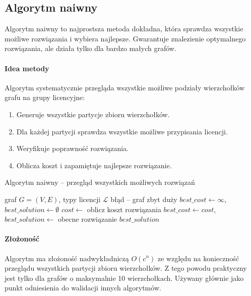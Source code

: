 \subsection{Algorytm naiwny}

Algorytm naiwny to najprostsza metoda dokładna, która sprawdza wszystkie możliwe rozwiązania i wybiera najlepsze. Gwarantuje znalezienie optymalnego rozwiązania, ale działa tylko dla bardzo małych grafów.

\paragraph{Idea metody}
Algorytm systematycznie przegląda wszystkie możliwe podziały wierzchołków grafu na grupy licencyjne:
\begin{enumerate}
  \item Generuje wszystkie partycje zbioru wierzchołków.
  \item Dla każdej partycji sprawdza wszystkie możliwe przypisania licencji.
  \item Weryfikuje poprawność rozwiązania.
  \item Oblicza koszt i zapamiętuje najlepsze rozwiązanie.
\end{enumerate}

\begin{algorithm}[H]
  \caption{Algorytm naiwny -- przegląd wszystkich możliwych rozwiązań}
  \label{alg:naive}
  \begin{algorithmic}[1]
    \Require graf $G=(V,E)$, typy licencji $\mathcal{L}$
     \State \Return błąd -- graf zbyt duży \EndIf
    \State $best\_cost \gets \infty$, $best\_solution \gets \emptyset$
    \State $cost \gets$ oblicz koszt rozwiązania
    \State $best\_cost \gets cost$, $best\_solution \gets$ obecne rozwiązanie
    \EndIf
    \EndIf
    \EndFor
    \EndFor
    \State \Return $best\_solution$
  \end{algorithmic}
\end{algorithm}

\paragraph{Złożoność}
Algorytm ma złożoność nadwykładniczą $O(c^n)$ ze względu na konieczność przeglądu wszystkich partycji zbioru wierzchołków. Z tego powodu praktyczny jest tylko dla grafów o maksymalnie 10 wierzchołkach. Używany głównie jako punkt odniesienia do walidacji innych algorytmów.


